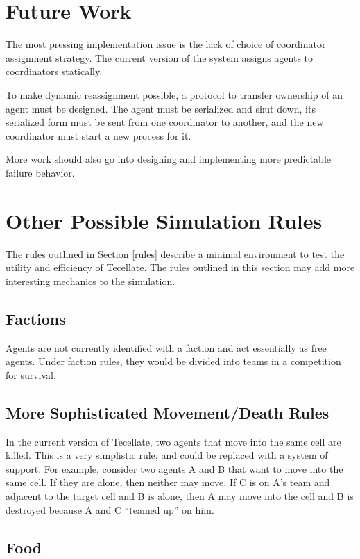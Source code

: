 \section{Future Work}

The most pressing implementation issue is the lack of choice of coordinator assignment strategy. The current version of the system assigns agents to coordinators statically.

To make dynamic reassignment possible, a protocol to transfer ownership of an agent must be designed. The agent must be serialized and shut down, its serialized form must be sent from one coordinator to another, and the new coordinator must start a new process for it.

More work should also go into designing and implementing more predictable failure behavior.

\section{Other Possible Simulation Rules}

The rules outlined in Section \ref{rules} describe a minimal environment to test the utility and efficiency of Tecellate. The rules outlined in this section may add more interesting mechanics to the simulation.

\subsection{Factions}

Agents are not currently identified with a faction and act essentially as free agents. Under faction rules, they would be divided into teams in a competition for survival.

\subsection{More Sophisticated Movement/Death Rules}

In the current version of Tecellate, two agents that move into the same cell are killed. This is a very simplistic rule, and could be replaced with a system of support. For example, consider two agents A and B that want to move into the same cell. If they are alone, then neither may move. If C is on A's team and adjacent to the target cell and B is alone, then A may move into the cell and B is destroyed because A and C ``teamed up'' on him.

\subsection{Food}

